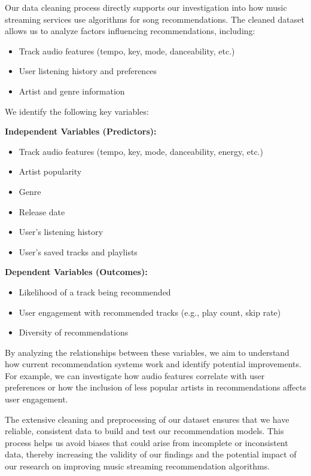 \documentclass[runningheads]{llncs}
\begin{document}
Our data cleaning process directly supports our investigation into how music streaming services use algorithms for song recommendations. The cleaned dataset allows us to analyze factors influencing recommendations, including:

\begin{itemize}
    \item Track audio features (tempo, key, mode, danceability, etc.)
    \item User listening history and preferences
    \item Artist and genre information
\end{itemize}

We identify the following key variables:

\textbf{Independent Variables (Predictors):}
\begin{itemize}
    \item Track audio features (tempo, key, mode, danceability, energy, etc.)
    \item Artist popularity
    \item Genre
    \item Release date
    \item User's listening history
    \item User's saved tracks and playlists
\end{itemize}

\textbf{Dependent Variables (Outcomes):}
\begin{itemize}
    \item Likelihood of a track being recommended
    \item User engagement with recommended tracks (e.g., play count, skip rate)
    \item Diversity of recommendations
\end{itemize}

By analyzing the relationships between these variables, we aim to understand how current recommendation systems work and identify potential improvements. For example, we can investigate how audio features correlate with user preferences or how the inclusion of less popular artists in recommendations affects user engagement.

The extensive cleaning and preprocessing of our dataset ensures that we have reliable, consistent data to build and test our recommendation models. This process helps us avoid biases that could arise from incomplete or inconsistent data, thereby increasing the validity of our findings and the potential impact of our research on improving music streaming recommendation algorithms.
\end{document}
